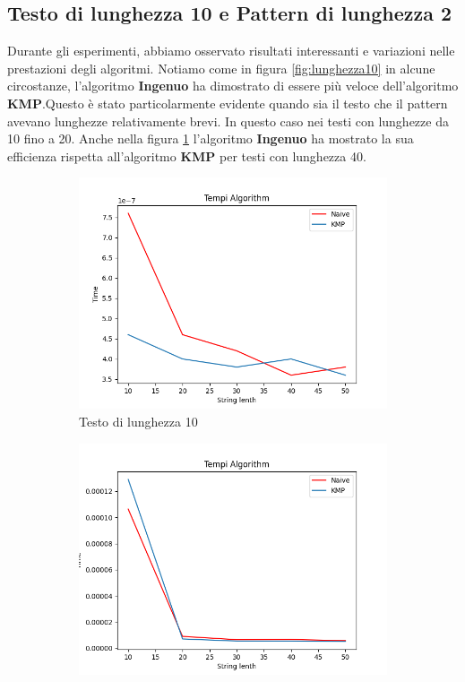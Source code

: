 \subsection{Testo di lunghezza 10 e Pattern di lunghezza 2}
Durante gli esperimenti, abbiamo osservato risultati interessanti e variazioni nelle prestazioni degli algoritmi. Notiamo come in figura \ref{fig:lunghezza10} in alcune circostanze, l'algoritmo \textbf{Ingenuo} ha dimostrato di essere più veloce dell'algoritmo \textbf{KMP}.Questo è stato particolarmente evidente quando sia il testo che il pattern avevano lunghezze relativamente brevi. In questo caso nei testi con lunghezze da 10 fino a 20. Anche nella figura \ref{fig:lenght10_1} l'algoritmo \textbf{Ingenuo} ha mostrato la sua efficienza rispetta all'algoritmo \textbf{KMP} per testi con lunghezza 40.
\begin{figure}[H]
    \centering
    \begin{subfigure}[b]{0.49\textwidth}
        \centering
        \includegraphics[width=\textwidth]{Resources/lenght10_1.png}
        \caption{Testo di lunghezza 10}
        \label{fig:lenght10_1}
    \end{subfigure}
    \hfill
    \begin{subfigure}[b]{0.49\textwidth}
        \centering
        \includegraphics[width=\textwidth]{Resources/lunghezza10.png}

\end{subfigure}
\end{figure}
